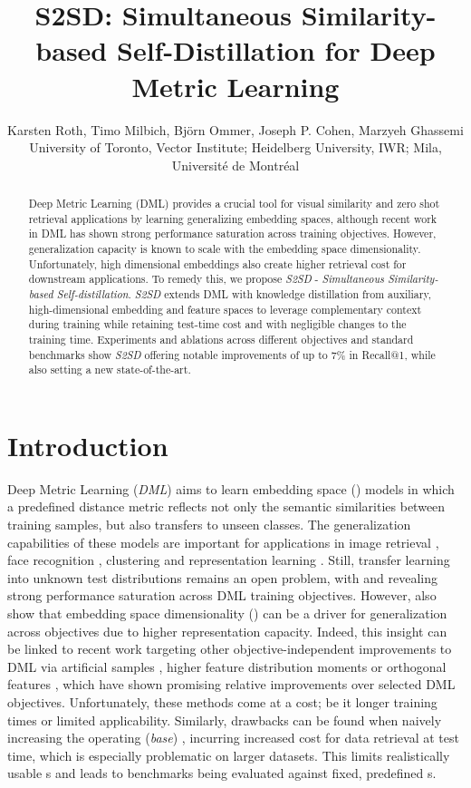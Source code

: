 \documentclass{article} \usepackage{arxiv_style,times}
\title{S2SD: Simultaneous Similarity-based Self-Distillation for Deep Metric Learning}
\author{Karsten Roth, Timo Milbich, Björn Ommer, Joseph P. Cohen, Marzyeh Ghassemi\\
\footnotesize{University of Toronto, Vector Institute; Heidelberg University, IWR; Mila, Université de Montréal}}
\begin{document}
\maketitle
\vspace{-16pt}

\begin{abstract}
Deep Metric Learning (DML) provides a crucial tool for visual similarity and zero shot retrieval applications by learning generalizing embedding spaces, although recent work in DML has shown strong performance saturation across training objectives.
However, generalization capacity is known to scale with the embedding space dimensionality. Unfortunately, high dimensional embeddings also create higher retrieval cost for downstream applications.
To remedy this, we propose \textit{S2SD} - \emph{Simultaneous Similarity-based Self-distillation}.  \textit{S2SD} extends DML with knowledge distillation from auxiliary, high-dimensional embedding and feature spaces to leverage complementary context during training while retaining test-time cost and with negligible changes to the training time. 
Experiments and ablations across different objectives and standard benchmarks show \textit{S2SD} offering notable improvements of up to 7\% in Recall@1, while also setting a new state-of-the-art. 
\end{abstract}

\section{Introduction}
Deep Metric Learning (\textit{DML}) aims to learn embedding space () models in which a predefined distance metric reflects not only the semantic similarities between training samples, but also transfers to unseen classes. The generalization capabilities of these models are important for applications in image retrieval \citep{margin}, face recognition \citep{semihard}, clustering \citep{grouping} and representation learning \citep{moco}.
Still, transfer learning into unknown test distributions remains an open problem, with \cite{roth2020revisiting} and \cite{musgrave2020metric} revealing strong performance saturation across DML training objectives. However, 
\cite{roth2020revisiting} also show that embedding space dimensionality () can be a driver for generalization across objectives due to higher representation capacity. 
Indeed, this insight can be linked to recent work targeting other objective-independent improvements to DML via artificial samples \citep{hardness-aware}, higher feature distribution moments \citep{horde} or orthogonal features \citep{milbich2020diva}, which have shown promising relative improvements over selected DML objectives.
Unfortunately, these methods come at a cost; be it longer training times or limited applicability.
Similarly, drawbacks can be found when naively increasing the operating (\textit{base}) , incurring increased cost for data retrieval at test time, which is especially problematic on larger datasets. This limits realistically usable s and leads to benchmarks being evaluated against fixed, predefined s.
\end{document}
